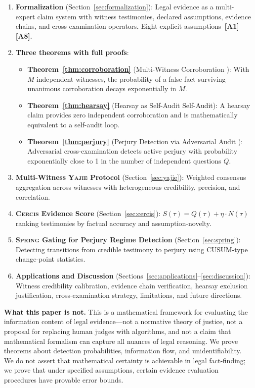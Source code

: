 \documentclass[11pt,a4paper]{article}
\theoremstyle{definition}
\newcommand{\Yajie}{\textsc{Yajie}}
\newcommand{\Spring}{\textsc{Spring}}
\newcommand{\Cercis}{\textsc{Cercis}}
\newcommand{\assumptionTag}[1]{\textsf{\textbf{[A#1]}}}
\begin{document}
\begin{enumerate}[label=(\roman*)]
    \item \textbf{Formalization} (Section~\ref{sec:formalization}): Legal evidence as a multi-expert claim system with witness testimonies, declared assumptions, evidence chains, and cross-examination operators. Eight explicit assumptions~\assumptionTag{1}--\assumptionTag{8}.
    \item \textbf{Three theorems with full proofs}:
    \begin{itemize}
        \item \textbf{Theorem~\ref{thm:corroboration}} (Multi-Witness Corroboration ): With $M$ independent witnesses, the probability of a false fact surviving unanimous corroboration decays exponentially in $M$.
        \item \textbf{Theorem~\ref{thm:hearsay}} (Hearsay as Self-Audit Self-Audit): A hearsay claim provides zero independent corroboration and is mathematically equivalent to a self-audit loop.
        \item \textbf{Theorem~\ref{thm:perjury}} (Perjury Detection via Adversarial Audit ): Adversarial cross-examination detects active perjury with probability exponentially close to 1 in the number of independent questions $Q$.
    \end{itemize}
    \item \textbf{Multi-Witness \Yajie{} Protocol} (Section~\ref{sec:yajie}): Weighted consensus aggregation across witnesses with heterogeneous credibility, precision, and correlation.
    \item \textbf{\Cercis{} Evidence Score} (Section~\ref{sec:cercis}): $S(\tau) = Q(\tau) + \eta \cdot N(\tau)$ ranking testimonies by factual accuracy and assumption-novelty.
    \item \textbf{\Spring{} Gating for Perjury Regime Detection} (Section~\ref{sec:spring}): Detecting transitions from credible testimony to perjury using CUSUM-type change-point statistics.
    \item \textbf{Applications and Discussion} (Sections~\ref{sec:applications}--\ref{sec:discussion}): Witness credibility calibration, evidence chain verification, hearsay exclusion justification, cross-examination strategy, limitations, and future directions.
\end{enumerate}

\textbf{What this paper is not.} This is a mathematical framework for evaluating the information content of legal evidence---not a normative theory of justice, not a proposal for replacing human judges with algorithms, and not a claim that mathematical formalism can capture all nuances of legal reasoning. We prove theorems about detection probabilities, information flow, and unidentifiability. We do not assert that mathematical certainty is achievable in legal fact-finding; we prove that under specified assumptions, certain evidence evaluation procedures have provable error bounds.
\end{document}
